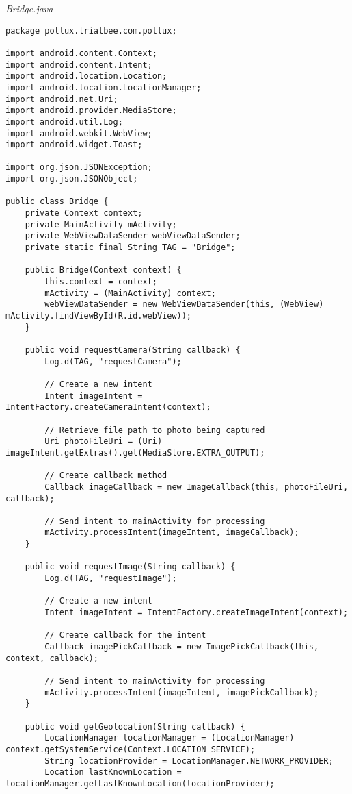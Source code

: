 \emph{Bridge.java}
\begin{lstlisting}
package pollux.trialbee.com.pollux;

import android.content.Context;
import android.content.Intent;
import android.location.Location;
import android.location.LocationManager;
import android.net.Uri;
import android.provider.MediaStore;
import android.util.Log;
import android.webkit.WebView;
import android.widget.Toast;

import org.json.JSONException;
import org.json.JSONObject;

public class Bridge {
    private Context context;
    private MainActivity mActivity;
    private WebViewDataSender webViewDataSender;
    private static final String TAG = "Bridge";

    public Bridge(Context context) {
        this.context = context;
        mActivity = (MainActivity) context;
        webViewDataSender = new WebViewDataSender(this, (WebView) mActivity.findViewById(R.id.webView));
    }

    public void requestCamera(String callback) {
        Log.d(TAG, "requestCamera");

        // Create a new intent
        Intent imageIntent = IntentFactory.createCameraIntent(context);

        // Retrieve file path to photo being captured
        Uri photoFileUri = (Uri) imageIntent.getExtras().get(MediaStore.EXTRA_OUTPUT);

        // Create callback method
        Callback imageCallback = new ImageCallback(this, photoFileUri, callback);

        // Send intent to mainActivity for processing
        mActivity.processIntent(imageIntent, imageCallback);
    }

    public void requestImage(String callback) {
        Log.d(TAG, "requestImage");

        // Create a new intent
        Intent imageIntent = IntentFactory.createImageIntent(context);

        // Create callback for the intent
        Callback imagePickCallback = new ImagePickCallback(this, context, callback);

        // Send intent to mainActivity for processing
        mActivity.processIntent(imageIntent, imagePickCallback);
    }

    public void getGeolocation(String callback) {
        LocationManager locationManager = (LocationManager) context.getSystemService(Context.LOCATION_SERVICE);
        String locationProvider = LocationManager.NETWORK_PROVIDER;
        Location lastKnownLocation = locationManager.getLastKnownLocation(locationProvider);


\end{lstlisting}
